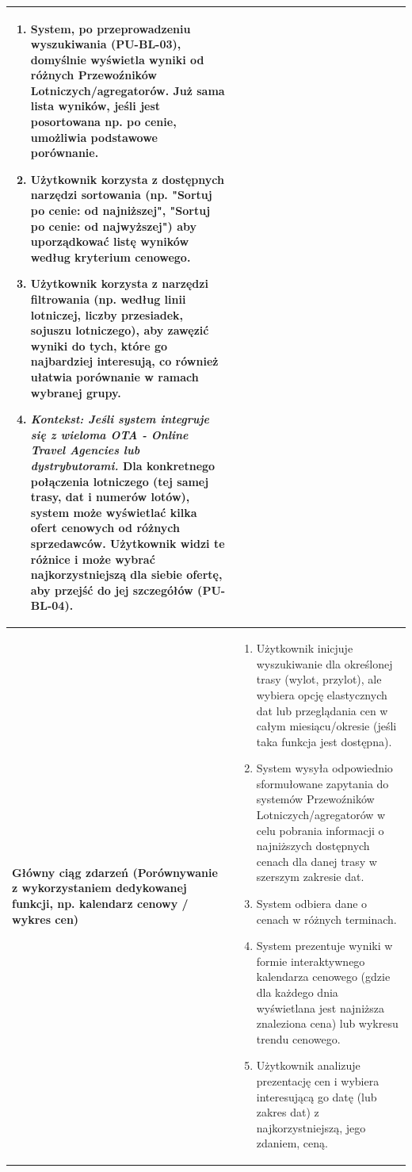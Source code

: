 \documentclass[a4paper,12pt]{article}
\begin{document}
\begin{longtable}{|p{\pierwszakolumnaszerokoscPUBLPorownCen}|p{\drugakolumnaszerokoscPUBLPorownCen}|}
        \begin{enumerate} \itemsep0pt \parskip0pt \parsep0pt
            \item System, po przeprowadzeniu wyszukiwania (PU-BL-03), domyślnie wyświetla wyniki od różnych Przewoźników Lotniczych/agregatorów. Już sama lista wyników, jeśli jest posortowana np. po cenie, umożliwia podstawowe porównanie.
            \item Użytkownik korzysta z dostępnych narzędzi sortowania (np. "Sortuj po cenie: od najniższej", "Sortuj po cenie: od najwyższej") aby uporządkować listę wyników według kryterium cenowego.
            \item Użytkownik korzysta z narzędzi filtrowania (np. według linii lotniczej, liczby przesiadek, sojuszu lotniczego), aby zawęzić wyniki do tych, które go najbardziej interesują, co również ułatwia porównanie w ramach wybranej grupy.
            \item \textit{Kontekst: Jeśli system integruje się z wieloma OTA - Online Travel Agencies lub dystrybutorami.} Dla konkretnego połączenia lotniczego (tej samej trasy, dat i numerów lotów), system może wyświetlać kilka ofert cenowych od różnych sprzedawców. Użytkownik widzi te różnice i może wybrać najkorzystniejszą dla siebie ofertę, aby przejść do jej szczegółów (PU-BL-04).
        \end{enumerate} \\
    \hline
    \textbf{Główny ciąg zdarzeń (Porównywanie z wykorzystaniem dedykowanej funkcji, np. kalendarz cenowy / wykres cen)} &
        \begin{enumerate} \itemsep0pt \parskip0pt \parsep0pt
            \item Użytkownik inicjuje wyszukiwanie dla określonej trasy (wylot, przylot), ale wybiera opcję elastycznych dat lub przeglądania cen w całym miesiącu/okresie (jeśli taka funkcja jest dostępna).
            \item System wysyła odpowiednio sformułowane zapytania do systemów Przewoźników Lotniczych/agregatorów w celu pobrania informacji o najniższych dostępnych cenach dla danej trasy w szerszym zakresie dat.
            \item System odbiera dane o cenach w różnych terminach.
            \item System prezentuje wyniki w formie interaktywnego kalendarza cenowego (gdzie dla każdego dnia wyświetlana jest najniższa znaleziona cena) lub wykresu trendu cenowego.
            \item Użytkownik analizuje prezentację cen i wybiera interesującą go datę (lub zakres dat) z najkorzystniejszą, jego zdaniem, ceną.

\end{enumerate}
\end{longtable}
\end{document}

